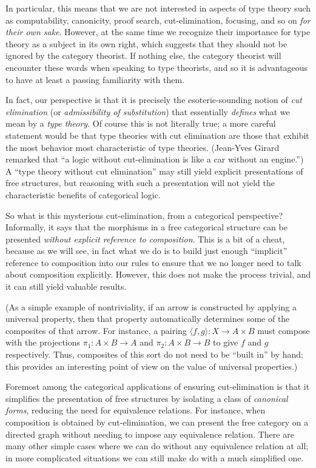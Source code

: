 \documentclass{book}
\def\pair#1#2{\langle #1,#2\rangle}
\begin{document}
In particular, this means that we are not interested in aspects of type theory such as computability, canonicity, proof search, cut-elimination, focusing, and so on \emph{for their own sake}.
However, at the same time we recognize their importance for type theory as a subject in its own right, which suggests that they should not be ignored by the category theorist.
If nothing else, the category theorist will encounter these words when speaking to type theorists, and so it is advantageous to have at least a passing familiarity with them.

In fact, our perspective is that it is precisely the esoteric-sounding notion of \emph{cut elimination} (or \emph{admissibility of substitution}) that essentially \emph{defines} what we mean by a \emph{type theory}.
Of course this is not literally true; a more careful statement would be that type theories with cut elimination are those that exhibit the most behavior most characteristic of type theories.
(Jean-Yves Girard remarked that ``a logic without cut-elimination is like a car without an engine.'')
A ``type theory without cut elimination'' may still yield explicit presentations of free structures, but reasoning with such a presentation will not yield the characteristic benefits of categorical logic.

So what is this mysterious cut-elimination, from a categorical perspective?
Informally, it says that the morphisms in a free categorical structure can be presented \emph{without explicit reference to composition}.
This is a bit of a cheat, because as we will see, in fact what we do is to build just enough ``implicit'' reference to composition into our rules to ensure that we no longer need to talk about composition explicitly.
However, this does not make the process trivial, and it can still yield valuable results.

(As a simple example of nontriviality, if an arrow is constructed by applying a universal property, then that property automatically determines some of the composites of that arrow.
For instance, a pairing $\pair{f}{g}:X\to A\times B$ must compose with the projections $\pi_1:A\times B\to A$ and $\pi_2:A\times B\to B$ to give $f$ and $g$ respectively.
Thus, composites of this sort do not need to be ``built in'' by hand; this provides an interesting point of view on the value of universal properties.)

Foremost among the categorical applications of ensuring cut-elimination is that it simplifies the presentation of free structures by isolating a class of \emph{canonical forms}, reducing the need for equivalence relations.
For instance, when composition is obtained by cut-elimination, we can present the free category on a directed graph without needing to impose any equivalence relation.
There are many other simple cases where we can do without any equivalence relation at all; in more complicated situations we can still make do with a much simplified one.
\end{document}
